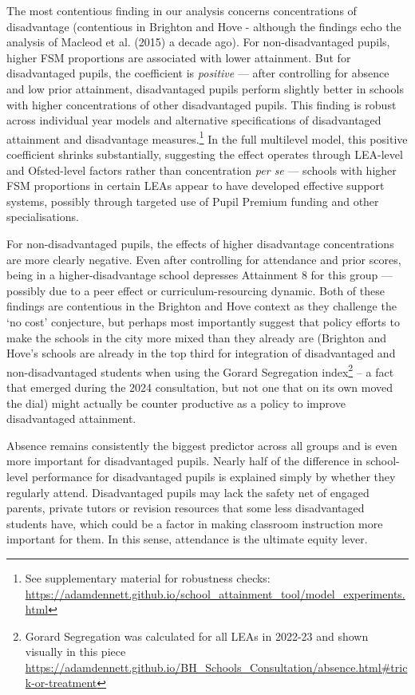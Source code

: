 \documentclass[
  12pt,
  titlepage]{article}
\begin{document}
The most contentious finding in our analysis concerns concentrations of
disadvantage (contentious in Brighton and Hove - although the findings
echo the analysis of Macleod et al. (2015) a decade ago). For
non-disadvantaged pupils, higher FSM proportions are associated with
lower attainment. But for disadvantaged pupils, the coefficient is
\emph{positive} --- after controlling for absence and low prior
attainment, disadvantaged pupils perform slightly better in schools with
higher concentrations of other disadvantaged pupils. This finding is
robust across individual year models and alternative specifications of
disadvantaged attainment and disadvantage measures.\footnote{See
  supplementary material for robustness checks:
  \url{https://adamdennett.github.io/school_attainment_tool/model_experiments.html}}
In the full multilevel model, this positive coefficient shrinks
substantially, suggesting the effect operates through LEA-level and
Ofsted-level factors rather than concentration \emph{per se} --- schools
with higher FSM proportions in certain LEAs appear to have developed
effective support systems, possibly through targeted use of Pupil
Premium funding and other specialisations.

For non-disadvantaged pupils, the effects of higher disadvantage
concentrations are more clearly negative. Even after controlling for
attendance and prior scores, being in a higher-disadvantage school
depresses Attainment 8 for this group --- possibly due to a peer effect
or curriculum-resourcing dynamic. Both of these findings are contentious
in the Brighton and Hove context as they challenge the `no cost'
conjecture, but perhaps most importantly suggest that policy efforts to
make the schools in the city more mixed than they already are (Brighton
and Hove's schools are already in the top third for integration of
disadvantaged and non-disadvantaged students when using the Gorard
Segregation index\footnote{Gorard Segregation was calculated for all
  LEAs in 2022-23 and shown visually in this piece
  \url{https://adamdennett.github.io/BH_Schools_Consultation/absence.html\#trick-or-treatment}}
-- a fact that emerged during the 2024 consultation, but not one that on
its own moved the dial) might actually be counter productive as a policy
to improve disadvantaged attainment.

Absence remains consistently the biggest predictor across all groups and
is even more important for disadvantaged pupils. Nearly half of the
difference in school-level performance for disadvantaged pupils is
explained simply by whether they regularly attend. Disadvantaged pupils
may lack the safety net of engaged parents, private tutors or revision
resources that some less disadvantaged students have, which could be a
factor in making classroom instruction more important for them. In this
sense, attendance is the ultimate equity lever.
\end{document}
